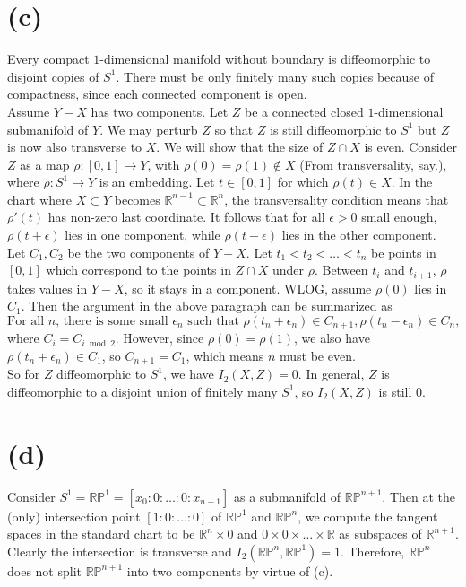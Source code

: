 \documentclass{amsbook}
\theoremstyle{theorem}
\theoremstyle{plain}
\theoremstyle{remark}
\newcommand{\R}{\mathbb R}
\renewcommand{\P}{\mathbb P}
\begin{document}
\section*{(c)}
Every compact $1$-dimensional manifold without boundary is diffeomorphic to disjoint copies of $S^1$. There must be only finitely many such copies because of compactness, since each connected component is open. \\

Assume $Y-X$ has two components. Let $Z$ be a connected closed $1$-dimensional submanifold of $Y$. We may perturb $Z$ so that $Z$ is still diffeomorphic to $S^1$ but $Z$ is now also transverse to $X$. We will show that the size of $Z \cap X$ is even. Consider $Z$ as a map $\rho: [0,1] \to Y$, with $\rho(0) = \rho(1) \not \in X$ (From transversality, say.), where $\rho: S^1 \to Y$ is an embedding. Let $t \in [0,1]$ for which $\rho(t) \in X$. In the chart where $X\subset Y$ becomes $\R^{n-1}\subset \R^n$, the transversality condition means that $\rho'(t)$ has non-zero last coordinate. It follows that for all $\epsilon > 0$ small enough, $\rho(t+\epsilon)$ lies in one component, while $\rho(t - \epsilon)$ lies in the other component.\\ 

Let $C_1, C_2$ be the two components of $Y-X$. Let $t_1 < t_2 < \dots < t_n$ be points in $[0,1]$ which correspond to the points in $Z\cap X$ under $\rho$. Between $t_i$ and $t_{i+1}$, $\rho$ takes values in $Y-X$, so it stays in a component. WLOG, assume $\rho(0)$ lies in $C_1$. Then the argument in the above paragraph can be summarized as \[\text{For all $n$, there is some small $\epsilon_n$ such that } \rho(t_n + \epsilon_n) \in C_{n+1}, \rho(t_n-\epsilon_n) \in C_n,\] where $C_i = C_{i\bmod 2}$. However, since $\rho(0) = \rho(1)$, we also have $\rho(t_n+\epsilon_n) \in C_1$, so $C_{n+1} = C_1$, which means $n$ must be even.\\

So for $Z$ diffeomorphic to $S^1$, we have $I_2(X,Z) = 0$. In general, $Z$ is diffeomorphic to a disjoint union of finitely many $S^1$, so $I_2(X,Z)$ is still $0$.
\section*{(d)}

Consider $S^1 = \R\P^1 = [x_0:0:\dots:0:x_{n+1}]$ as a submanifold of $\R\P^{n+1}$. Then at the (only) intersection point $[1:0:\dots:0]$ of $\R\P^1$ and $\R\P^n$, we compute the tangent spaces in the standard chart to be $\R^n \times 0$ and $0\times 0 \times \dots \times \R$ as subspaces of $\R^{n+1}$. Clearly the intersection is transverse and $I_2(\R\P^n, \R\P^1) = 1$. Therefore, $\R\P^n$ does not split $\R\P^{n+1}$ into two components by virtue of (c). \\
\end{document}
